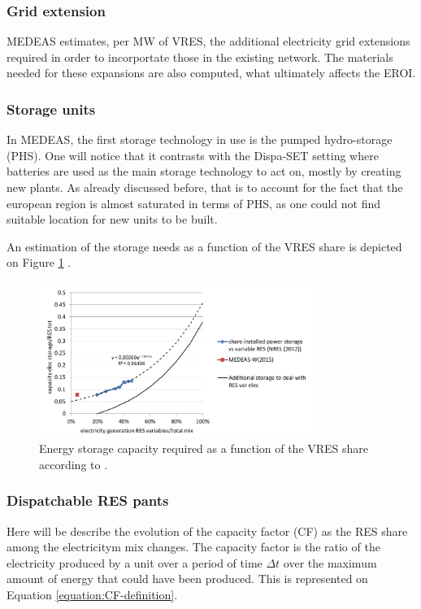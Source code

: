 \subsubsection{Grid extension}

MEDEAS estimates, per MW of VRES, the additional electricity grid extensions required in order to incorportate those in the existing network. The materials needed for these expansions are also computed, what ultimately affects the EROI.

\subsubsection{Storage units}

In MEDEAS, the first storage technology in use is the pumped hydro-storage (PHS). One will notice that it contrasts with the Dispa-SET setting where batteries are used as the main storage technology to act on, mostly by creating new plants. As already discussed before, that is to account for the fact that the european region is almost saturated in terms of PHS, as one could not find suitable location for new units to be built.

An estimation of the storage needs as a function of the VRES share is depicted on Figure \ref{fig:storage-vres} \cite{NREL}.

\begin{figure}[h]
    \includegraphics[width=0.8\textwidth]{resources/images/storage.png}
    \caption{Energy storage capacity required as a function of the VRES share according to \cite{NREL}.}
    \label{fig:storage-vres}
\end{figure}

\subsubsection{Dispatchable RES pants}

Here will be describe the evolution of the capacity factor (CF) as the RES share among the electricitym mix changes. The capacity factor is the ratio of the electricity produced by a unit over a period of time $\Delta t$ over the maximum amount of energy that could have been produced. This is represented on Equation \ref{equation:CF-definition}.

